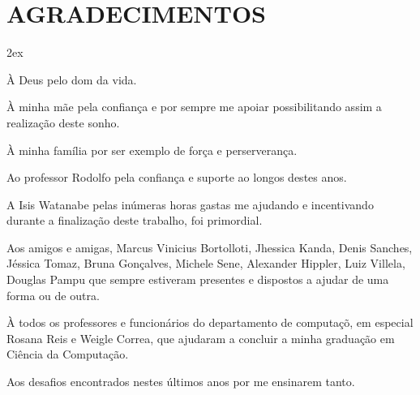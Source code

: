 \chapter*{AGRADECIMENTOS}
\begin{trivlist}  \itemsep 2ex  \normalsize
	\item \`{A} Deus pelo dom da vida.
        \item \`{A} minha m\~{a}e pela confian\c{c}a e por sempre me apoiar possibilitando assim a realiza\c{c}\~ao deste sonho.
        \item \`{A} minha fam\'{i}lia por ser exemplo de for\c{c}a e perserveran\c{c}a.
        \item Ao professor Rodolfo pela confian\c{c}a e suporte ao longos destes anos.
        \item A Isis Watanabe pelas in\'{u}meras horas gastas me ajudando e incentivando durante a finaliza\c{c}\~ao deste trabalho, foi primordial.
	\item Aos amigos e amigas, Marcus Vinicius Bortolloti, Jhessica Kanda, Denis Sanches, J\'{e}ssica Tomaz, Bruna Gon\c{c}alves, Michele Sene, 
	      Alexander Hippler, Luiz Villela, Douglas Pampu que sempre estiveram presentes e dispostos a ajudar de uma forma ou de outra.
        \item \`{A} todos os professores e funcion\'{a}rios do departamento de computa\c{c}\~o, em especial Rosana Reis e Weigle Correa, que ajudaram a 
		concluir a minha gradua\c{c}\~ao em Ci\^{e}ncia da Computa\c{c}\~ao.
	\item Aos desafios encontrados nestes \'{u}ltimos anos por me ensinarem tanto.
\end{trivlist}
